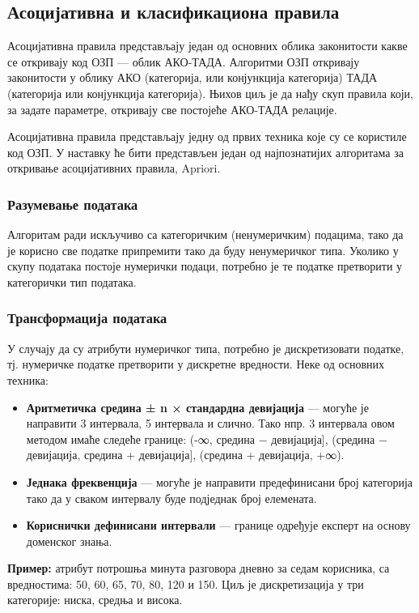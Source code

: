 \subsection{Асоцијативна и класификациона правила}
Асоцијативна правила представљају један од основних облика законитости какве се откривају код ОЗП — облик АКО-ТАДА. Алгоритми ОЗП откривају законитости у облику АКО (категорија, или конјункција категорија) ТАДА (категорија или конјункција категорија). Њихов циљ је да нађу скуп правила који, за задате параметре, откривају све постојеће АКО-ТАДА релације.

Асоцијативна правила представљају једну од првих техника које су се користиле код ОЗП. У наставку ће бити представљен један од најпознатијих алгоритама за откривање асоцијативних правила, Apriori.

\subsubsection{Разумевање података}
Алгоритам ради искључиво са категоричким (ненумеричким) подацима, тако да је корисно све податке припремити тако да буду ненумеричког типа. Уколико у скупу података постоје нумерички подаци, потребно је те податке претворити у категорички тип података.

\subsubsection{Трансформација података}
У случају да су атрибути нумеричког типа, потребно је дискретизовати податке, тј. нумеричке податке претворити у дискретне вредности. Неке од основних техника:

\begin{itemize}
  \item \textbf{Аритметичка средина ± n × стандардна девијација} — могуће је направити 3 интервала, 5 интервала и слично. Тако нпр. 3 интервала овом методом имаће следеће границе: (-∞, средина − девијација], (средина − девијација, средина + девијација], (средина + девијација, +∞).
  \item \textbf{Једнака фреквенција} — могуће је направити предефинисани број категорија тако да у сваком интервалу буде подједнак број елемената.
  \item \textbf{Кориснички дефинисани интервали} — границе одређује експерт на основу доменског знања.
\end{itemize}
\textbf{Пример:} атрибут потрошња минута разговора дневно за седам корисника, са вредностима: 50, 60, 65, 70, 80, 120 и 150. Циљ је дискретизација у три категорије: ниска, средња и висока.

